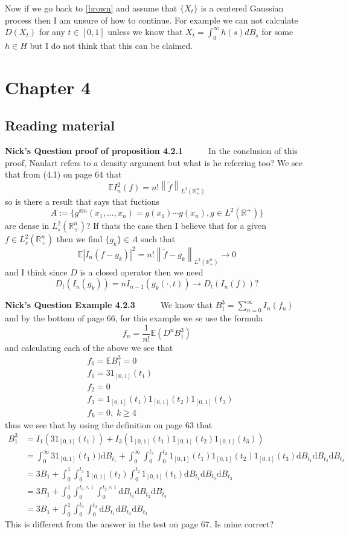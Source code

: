 \documentclass[a4paper,11pt]{article}
\numberwithin{equation}{section}
\theoremstyle{plain}
\theoremstyle{definition}
\newcommand{\ud}{\ensuremath{\mathrm{d}}}
\newcommand{\Norm}[1]{\left\|  #1   \right\|}
\newcommand{\R}{\mathbb{R}}
\newcounter{NQ}
\newenvironment{NickQuestion}[1][] %
{\refstepcounter{NQ}
	\begin{mdframed}[backgroundcolor=lightgray]\textbf{Nick's Question \theNQ \: #1~~}~~~\noindent}%
	{\end{mdframed}}
\numberwithin{NQ}{section}
\numberwithin{LQ}{section}
\numberwithin{ZQ}{section}
\begin{document}
Now if we go back to \eqref{brown} and assume that $\{X_t\}$ is a centered Gaussian process then I am unsure of how to continue. For example we can not calculate $D(X_t)$ for any $t\in[0,1]$ unless we know that $X_t = \int_0^\infty h(s)dB_s$ for some $h \in H$ but I do not think that this can be claimed. 


\section{Chapter 4}
\subsection{Reading material} 
\begin{NickQuestion}[proof of proposition 4.2.1]
	In the conclusion of this proof, Naulart refers to a density argument but what is he referring too? We see that from (4.1) on page 64 that 
	\[
		\mathbb{E}I_n^2(f) = n!\Norm{\tilde{f}}_{L^2(\R_+^n)}
	\]
so is there a result that says that fuctions  
\[
A:=\{g^{\otimes n}(x_1,...,x_n) = g(x_1)\cdots g(x_n), g\in L^2(\R^+)\}
\]
 are dense in $L^2_s(\R^n_+)$? If thats the case then I believe that for a given $f \in L^2_s(\R^n_+)$ then we find $\{g_k\}\in A$ such that 
 \[
 	\mathbb{E}|I_n(f-g_k)|^2 = n!\Norm{\tilde{f}-g_k}_{L^2(\R_+^n)} \to 0
 \]
 and I think since $D$ is a closed operator then we need 
 \[
 D_t(I_n(g_k)) = nI_{n-1}(g_k(\cdot,t)) \to D_t(I_n(f))?
 \]
\end{NickQuestion}

\begin{NickQuestion}[Example 4.2.3]
	We know that $B_1^3=\sum_{n=0}^\infty I_n(f_n)$ and by the bottom of page 66, for this example we se use the formula 
	\[
	f_n=\dfrac{1}{n!}\mathbb{E}(D^nB_1^3)
	\]
and calculating each of the above we see that 
\begin{align*}
&f_0 = \mathbb{E}B_1^3=0
\\& f_1 = 31_{[0,1]}(t_1)
\\& f_2 =0
\\& f_3 = 1_{[0,1]}(t_1) 1_{[0,1]}(t_2) 1_{[0,1]}(t_3)
\\& f_k = 0,\; k \ge 4
\end{align*}
thus we see that by using the definition on page 63 that
\begin{align*}
B_1^3 &= I_1(31_{[0,1]}(t_1)) + I_3(1_{[0,1]}(t_1) 1_{[0,1]}(t_2) 1_{[0,1]}(t_3))
\\&= \int_0^\infty 31_{[0,1]}(t_1)) \ud B_{t_1} + \int_0^\infty \int_0^{t_3}\int_0^{t_2}1_{[0,1]}(t_1) 1_{[0,1]}(t_2) 1_{[0,1]}(t_3) \ud B_{t_1} \ud B_{t_2} \ud B_{t_3}
\\&= 3B_1 + \int_0^1 \int_0^{t_3} 1_{[0,1]}(t_2) \int_0^{t_2}1_{[0,1]}(t_1)  \ud B_{t_1} \ud B_{t_2} \ud B_{t_3}
\\&= 3B_1 + \int_0^1 \int_0^{t_3 \wedge 1} \int_0^{t_2 \wedge 1} \ud B_{t_1} \ud B_{t_2} \ud B_{t_3}
\\& =  3B_1 + \int_0^1 \int_0^{t_3} \int_0^{t_2} \ud B_{t_1} \ud B_{t_2} \ud B_{t_3}
\end{align*}
This is different from the answer in the test on page 67. Is mine correct? 
\end{NickQuestion}
\end{document}
